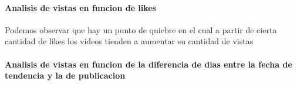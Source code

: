         \paragraph{Analisis de vistas en funcion de likes}
            \begin{figure}
            \end{figure}
        \FloatBarrier
        Podemos observar que hay un punto de quiebre en el cual a partir de
        cierta cantidad de likes los videos tienden a aumentar su cantidad
        de vistas
        \newpage

        \paragraph{Analisis de vistas en funcion de la diferencia de dias entre la fecha de tendencia y la de publicacion}

